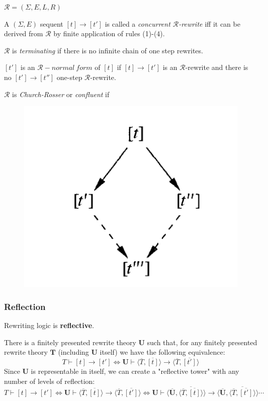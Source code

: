 \documentclass{beamer}
\begin{document}
\begin{frame}
    $\mathcal{R} = (\Sigma, E, L, R)$
    \small
    
    \medskip
    A $(\Sigma, E)$ sequent $[t] \rightarrow [t']$ is called  a \emph{concurrent $\mathcal{R}$-rewrite} iff it can be derived from $\mathcal{R}$ by finite application   of rules (1)-(4).
    
   
    \medskip
    $\mathcal{R}$ is \emph{terminating} if there is no infinite chain of one step rewrites.

    \medskip
    $[t']$ is an $\mathcal{R}-normal\ form$ of $[t]$ if $[t] \rightarrow [t']$ is an 
    $\mathcal{R}$-rewrite and there is no $[t'] \rightarrow [t'']$ one-step  $\mathcal{R}$-rewrite.
    

    
    \medskip
    $\mathcal{R}$ is \emph{Church-Rosser} or \emph{confluent} if
    \begin{figure}
        \includegraphics[scale=0.2]{img/churchrosser.png}
    \end{figure}
    
\end{frame}
\begin{frame}
    \frametitle{Reflection}

    Rewriting logic is \textbf{reflective}.

    
    \bigskip 
    There is a finitely presented rewrite theory $\mathbf{U}$ such that, for 
        any finitely presented rewrite theory $\mathbf{T}$ (including $\mathbf{U}$ itself) we have 
        the following equivalence:
       {\small $$
        T \vdash [t] \rightarrow [t'] \Longleftrightarrow \mathbf{U} \vdash  \langle \overline{T},\overline{[t]} \rangle  \rightarrow \langle \overline{T},\overline{[t']} \rangle
        $$ 
       }
        \bigskip
    Since $\mathbf{U}$ is representable in itself, we can create a "reflective tower" with any 
    number of levels of reflection:
    {\scriptsize
    $$T \vdash [t] \rightarrow [t'] \Leftrightarrow \mathbf{U} \vdash  \langle \overline{T},\overline{[t]} \rangle  \rightarrow \langle \overline{T},\overline{[t']} \rangle
    \Leftrightarrow\mathbf{U} \vdash  \langle \overline{\mathbf{U}},\overline{\langle \overline{T},\overline{[t]} \rangle} \rangle  \rightarrow  
    \langle \overline{\mathbf{U}},\overline{\langle \overline{T},\overline{[t']} \rangle} \rangle \cdots $$
    }
\end{frame}
\end{document}
